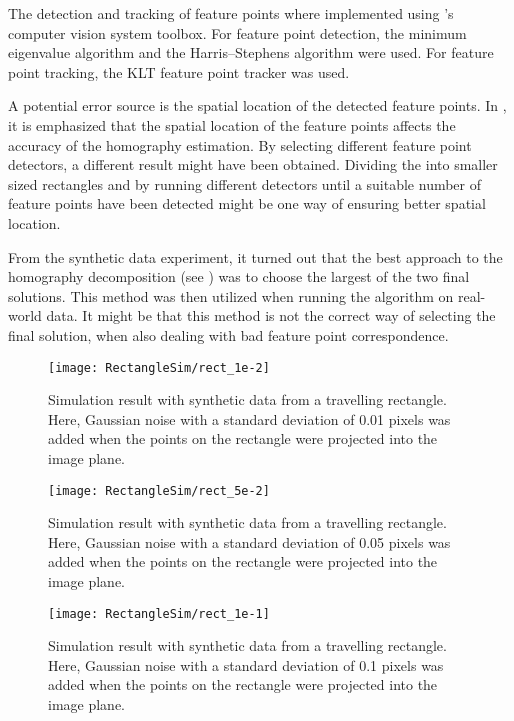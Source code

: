 The detection and tracking of feature points where implemented using \matlab's computer vision system toolbox.
For feature point detection, the minimum eigenvalue algorithm \cite{mineigendetector:2018} and the Harris–Stephens algorithm \cite{harrisdetector:2018} were used.
For feature point tracking, the KLT feature point tracker \cite{pointtracker:2018} was used.

A potential error source is the spatial location of the detected feature points.
In \cite{Bostanci:2012}, it is emphasized that the spatial location of the feature points affects the accuracy of the homography estimation.
By selecting different feature point detectors, a different result might have been obtained.
Dividing the \abbrROI into smaller sized rectangles and by running different detectors until a suitable number of feature points have been detected might be one way of ensuring better spatial location.

From the synthetic data experiment, it turned out that the best approach to the homography decomposition (see ) was to choose the largest of the two final solutions.
This method was then utilized when running the algorithm on real-world data.
It might be that this method is not the correct way of selecting the final solution, when also dealing with bad feature point correspondence.

\clearpage

\begin{figure}[!ht]
	\centering
	\texttt{[image: RectangleSim/rect\_1e-2]}
	\caption{\label{fig:rectsim1e-2} Simulation result with synthetic data from a travelling rectangle. Here, Gaussian noise with a standard deviation of 0.01 pixels was added when the points on the rectangle were projected into the image plane.}
\end{figure}

\begin{figure}[!ht]
	\centering
	\texttt{[image: RectangleSim/rect\_5e-2]}
	\caption{\label{fig:rectsim5e-2} Simulation result with synthetic data from a travelling rectangle. Here, Gaussian noise with a standard deviation of 0.05 pixels was added when the points on the rectangle were projected into the image plane.}
\end{figure}

\begin{figure}[!ht]
	\centering
	\texttt{[image: RectangleSim/rect\_1e-1]}
	\caption{\label{fig:rectsim1e-1} Simulation result with synthetic data from a travelling rectangle. Here, Gaussian noise with a standard deviation of 0.1 pixels was added when the points on the rectangle were projected into the image plane.}
\end{figure}

